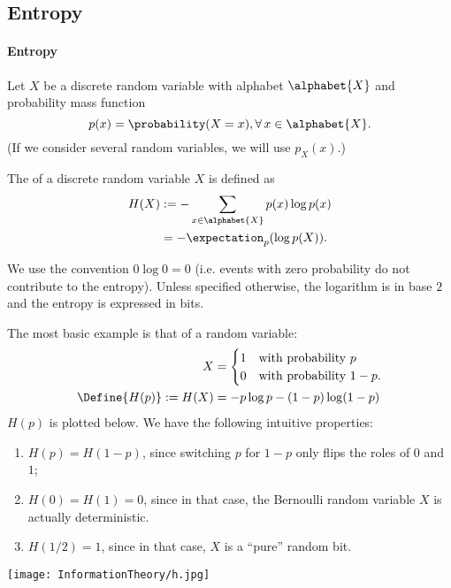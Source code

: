 \documentclass[a4paper, 11pt, openany]{book}
\begin{document}
\subsection{Entropy}

\paragraph{Entropy}
Let $X$ be a discrete random variable with alphabet $\alphabet{X}$ and probability mass function
$$
	p(x) = \probability(X = x), \forall \, x \in \alphabet{X}.
$$
(If we consider several random variables, we will use $p_X(x)$.)

The  of a discrete random variable $X$ is defined as
\begin{align*}
	H(X) &:= - \sum_{x \in \alphabet{X}} p(x) \log p(x)\\
	&= - \expectation_p ( \log p(X) ).
\end{align*}

We use the convention $0 \log 0 = 0$ (i.e. events with zero probability do not contribute to the entropy). Unless specified otherwise, the logarithm is in base $2$ and the entropy is expressed in bits.


The most basic example is that of a  random variable:
\begin{align*}
	X &= \begin{cases}
			1 & \mbox{with probability } p\\
			0 & \mbox{with probability } 1-p.
		\end{cases}\\
	\Define{H(p)} := H(X) &= -p \log p - (1-p) \log(1-p)
\end{align*}
$H(p)$ is plotted below. We have the following intuitive properties:
\begin{enumerate}
    \item $H(p) = H(1-p)$, since switching $p$ for $1-p$ only flips the roles of $0$ and $1$;

    \item $H(0) = H(1) = 0$, since in that case, the Bernoulli random variable $X$ is actually deterministic.

    \item $H(1/2) = 1$, since in that case, $X$ is a ``pure'' random bit.
\end{enumerate}

\begin{center}
\texttt{[image: InformationTheory/h.jpg]}
\end{center}
\end{document}
